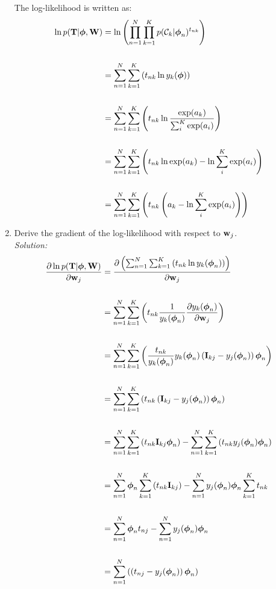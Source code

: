 \documentclass[12pt,a4paper]{article}
\newcommand{\lp}{\left(}
\newcommand{\rp}{\right)}
\newcommand{\eye}{{\bf I}}
\newcommand{\tscalar}{t}
\newcommand{\Tmat}{{\bf \MakeUppercase\tscalar}}
\newcommand{\wscalar}{w}
\newcommand{\wvec}{{\bf \wscalar}}
\newcommand{\Wmat}{{\bf \MakeUppercase\wscalar}}
\newcommand{\phivec}{\boldsymbol{\phi}}
\newcommand{\class}{\mathcal{C}}
\begin{document}
\begin{enumerate}
		The log-likelihood is written as:
		\begin{align*}
		\ln p(\Tmat | \phivec, \Wmat) &= \ln \lp \prod_{n=1}^N \prod_{k=1}^K p(\class_k | \phivec_n)^{t_{nk}} \rp \\\\
		&= \sum_{n=1}^N \sum_{k=1}^K \lp t_{nk} \ln y_k(\phivec) \rp \\\\
		&= \sum_{n=1}^N \sum_{k=1}^K \lp t_{nk} \ln \frac{\exp(a_k)}{\sum_i^K \exp(a_i)} \rp \\\\
		&= \sum_{n=1}^N \sum_{k=1}^K \lp t_{nk} \ln \exp(a_k) - \ln \sum_i^K \exp(a_i) \rp \\\\
		&= \sum_{n=1}^N \sum_{k=1}^K \lp t_{nk} \lp a_k - \ln \sum_i^K \exp(a_i) \rp \rp
		\end{align*}
		
		\item Derive the gradient of the log-likelihood with respect to $\wvec_{j}$. \\
		\emph{Solution:} \\
		
		\begin{align*}
		\frac{\partial \ln p(\Tmat | \phivec, \Wmat)}{\partial \wvec_j} &= \frac{\partial \lp \sum_{n=1}^N \sum_{k=1}^K \lp t_{nk} \ln y_k(\phivec_n) \rp \rp}{\partial \wvec_j} \\\\
		&= \sum_{n=1}^N \sum_{k=1}^K \lp t_{nk} \frac{1}{y_k(\phivec_n)} \frac{\partial y_k(\phivec_n)}{\partial \wvec_j} \rp \\\\
		&= \sum_{n=1}^N \sum_{k=1}^K \lp \frac{t_{nk}}{y_k(\phivec_n)} y_k(\phivec_n) \lp \eye_{kj} - y_j(\phivec_n) \rp \phivec_n \rp \\\\
		&= \sum_{n=1}^N \sum_{k=1}^K \lp t_{nk} \lp \eye_{kj} - y_j(\phivec_n) \rp \phivec_n \rp \\\\
		&= \sum_{n=1}^N \sum_{k=1}^K \lp t_{nk} \eye_{kj} \phivec_n \rp - \sum_{n=1}^N \sum_{k=1}^K \lp t_{nk} y_j(\phivec_n) \phivec_n \rp \\\\
		&= \sum_{n=1}^N \phivec_n \sum_{k=1}^K \lp t_{nk} \eye_{kj} \rp - \sum_{n=1}^N y_j(\phivec_n) \phivec_n \sum_{k=1}^K t_{nk} \\\\
		&= \sum_{n=1}^N \phivec_n  t_{nj} - \sum_{n=1}^N y_j(\phivec_n) \phivec_n \\\\
		&= \sum_{n=1}^N \lp \lp  t_{nj} -  y_j(\phivec_n) \rp \phivec_n \rp
		\end{align*}
		

\end{enumerate}
\end{document}
